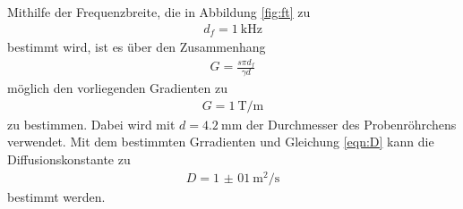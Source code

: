 Mithilfe der Frequenzbreite, die in Abbildung \ref{fig:ft} zu 
\begin{align}
  d_f = \SI{1}{\kilo\hertz}
\end{align}
bestimmt wird, ist es über den Zusammenhang
\begin{align}
  G = \frac{s\pi d_f}{\gamma d}
\end{align}
möglich den vorliegenden Gradienten zu
\begin{align}
  G = \SI{1}{\tesla\per\meter}
\end{align}
zu bestimmen. Dabei wird mit $d = \SI{4.2}{\milli\meter}$ der Durchmesser des Probenröhrchens verwendet.
Mit dem bestimmten Grradienten und Gleichung \ref{eqn:D} kann die Diffusionskonstante zu 
\begin{align}
  D = \SI{1(01)}{\square\meter\per\second}
\end{align}
bestimmt werden.
